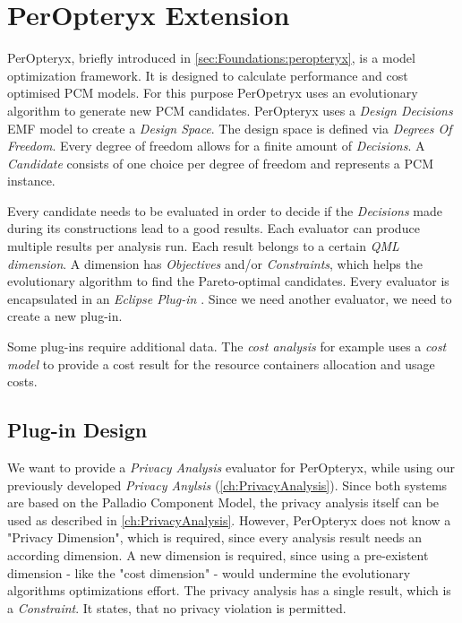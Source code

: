 \chapter{PerOpteryx Extension}
\label{ch:PerOpt}

PerOpteryx, briefly introduced in \autoref{sec:Foundations:peropteryx}, is a model optimization framework. It is designed to calculate performance and cost optimised PCM models. For this purpose PerOpetryx uses an evolutionary algorithm to generate new PCM candidates. PerOpteryx uses a \textit{Design Decisions} EMF model to create a \textit{Design Space}. The design space is defined via \textit{Degrees Of Freedom}. Every degree of freedom allows for a finite amount of \textit{Decisions}. A \textit{Candidate} consists of one choice per degree of freedom and represents a PCM instance. 

Every candidate needs to be evaluated in order to decide if the \textit{Decisions} made during its constructions lead to a good results. Each evaluator can produce multiple results per analysis run. Each result belongs to a certain \textit{QML dimension}. A dimension has \textit{Objectives} and/or \textit{Constraints}, which helps the evolutionary algorithm to find the Pareto-optimal candidates. Every evaluator is encapsulated in an \textit{Eclipse Plug-in} \cite{PerOpteryx.b}. Since we need another evaluator, we need to create a new plug-in.

Some plug-ins require additional data. The \textit{cost analysis} for example uses a \textit{cost model} to provide a cost result for the resource containers allocation and usage costs. 

\section{Plug-in Design}
\label{sec:PerOpt:design}

We want to provide a \textit{Privacy Analysis} evaluator for PerOpteryx, while using our previously developed \textit{Privacy Anylsis} (\autoref{ch:PrivacyAnalysis}). Since both systems are based on the Palladio Component Model, the privacy analysis itself can be used as described in \autoref{ch:PrivacyAnalysis}. However, PerOpteryx does not know a "Privacy Dimension", which is required, since every analysis result needs an according dimension. A new dimension is required, since using a pre-existent dimension - like the "cost dimension" - would undermine the evolutionary algorithms optimizations effort. The privacy analysis has a single result, which is a \textit{Constraint}. It states, that no privacy violation is permitted.

